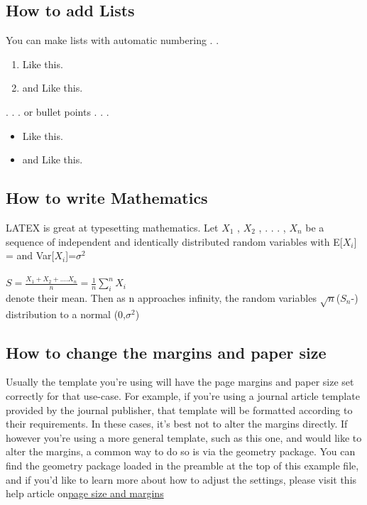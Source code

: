 \documentclass{article}
\begin{document}
    \subsection{How to add Lists}
    You can make lists with automatic numbering . .
    \begin{enumerate}
        \item Like this.
        \item and Like this.
    \end{enumerate}
    . . . or bullet points . . .	
    \begin{itemize}
    	\item Like this.
    	\item and Like this.
    \end{itemize}
   \subsection{How to write Mathematics}
   LATEX is great at typesetting mathematics. Let $X_1$ , $X_2$ , . . . , $X_n$ be a sequence of independent and
   identically distributed random variables with E[$X_i$] = \textmu  and Var[$X_i$]=$\sigma^2$
   \\
   \\
   \begin{math}
   	S=\frac{X_1+X_2+....X_n}{n} =\frac{1}{n}\sum^n_i X_i
   \end{math}
    \\
    denote their mean. Then as n approaches infinity, the random variables $\sqrt{n}$($S_n$-\textmu)
    distribution to a normal (0,$\sigma^2$)
   \subsection{How to change the margins and paper size}
   Usually the template you’re using will have the page margins and paper size set correctly for that
   use-case. For example, if you’re using a journal article template provided by the journal publisher,
   that template will be formatted according to their requirements. In these cases, it’s best not to alter
   the margins directly.
   If however you’re using a more general template, such as this one, and would like to alter the
   margins, a common way to do so is via the geometry package. You can find the geometry package
   loaded in the preamble at the top of this example file, and if you’d like to learn more about how to
   adjust the settings, please visit this help article on\href{https://www.overleaf.com/learn/latex/page_size_and_margins}{page size and margins}
\end{document}
